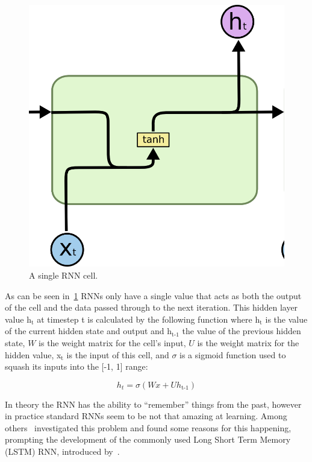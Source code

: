 \begin{figure}
	\begin{center}
		\includegraphics[scale=0.5]{rnn/rnn_cell}
	\end{center}
	\caption{A single RNN cell.\label{fig:rnn_cell}}
\end{figure}

As can be seen in~\ref{fig:rnn_cell} RNNs only have a single value that acts as both the output of the cell and the data passed through to the next iteration. This hidden layer value h$_{\text{t}}$ at timestep t is calculated by the following function where h$_{\text{t}}$ is the value of the current hidden state and output and h$_{\text{t-1}}$ the value of the previous hidden state, $W$ is the weight matrix for the cell's input, $U$ is the weight matrix for the hidden value, x$_{\text{t}}$ is the input of this cell, and $\sigma$ is a sigmoid function used to squash its inputs into the [-1, 1] range:

$$ h_t = \sigma(Wx + Uh_\text{t-1}) $$

In theory the RNN has the ability to \enquote{remember} things from the past, however in practice standard RNNs seem to be not that amazing at learning. Among others~\cite{bengio1994learning} investigated this problem and found some reasons for this happening, prompting the development of the commonly used Long Short Term Memory (LSTM) RNN, introduced by~\cite{hochreiter1997long}\@.

